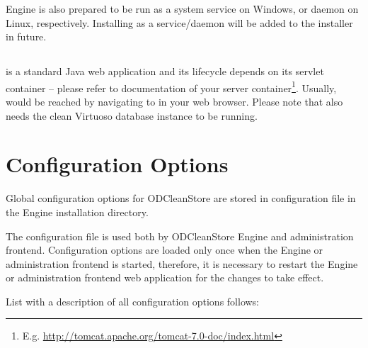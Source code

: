 Engine is also prepared to be run as a system service on Windows, or daemon on Linux, respectively. Installing \odcs as a service/daemon will be added to the installer in future.

\section{\FE}
\FE is a standard Java web application and its lifecycle depends on its servlet container -- please refer to documentation of your server container\footnote{E.g. \url{http://tomcat.apache.org/tomcat-7.0-doc/index.html}}. Usually, \FE would be reached by navigating to  in your web browser. Please note that \FE also needs the clean Virtuoso database instance to be running.

\chapter{Configuration Options}
 \label{chap:configOptions}
Global configuration options for ODCleanStore are stored in configuration file  in the Engine installation directory.

The configuration file is used both by ODCleanStore Engine and administration frontend. Configuration options are loaded only once when the Engine or administration frontend is started, therefore, it is necessary to restart the Engine or administration frontend web application for the changes to take effect.

List with a description of all configuration options follows:

